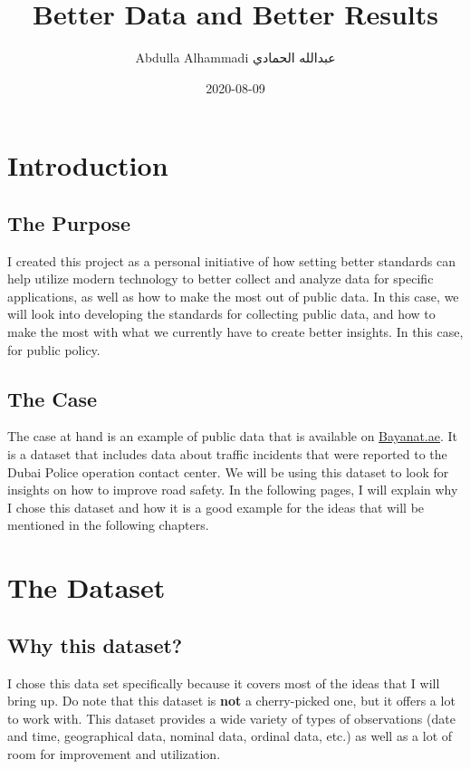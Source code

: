 \documentclass[
]{book}
\title{Better Data and Better Results}
\author{Abdulla Alhammadi \textbar{} عبدالله الحمادي}
\date{2020-08-09}
\begin{document}
\maketitle

{
\setcounter{tocdepth}{1}
\tableofcontents
}
\hypertarget{intro}{%
\chapter{Introduction}\label{intro}}

\hypertarget{the-purpose}{%
\section{The Purpose}\label{the-purpose}}

I created this project as a personal initiative of how setting better standards can help utilize modern technology to better collect and analyze data for specific applications, as well as how to make the most out of public data. In this case, we will look into developing the standards for collecting public data, and how to make the most with what we currently have to create better insights. In this case, for public policy.

\hypertarget{the-case}{%
\section{The Case}\label{the-case}}

The case at hand is an example of public data that is available on \href{https://bayanat.ae}{Bayanat.ae}. It is a dataset that includes data about traffic incidents that were reported to the Dubai Police operation contact center. We will be using this dataset to look for insights on how to improve road safety. In the following pages, I will explain why I chose this dataset and how it is a good example for the ideas that will be mentioned in the following chapters.

\hypertarget{the-dataset}{%
\chapter{The Dataset}\label{the-dataset}}

\hypertarget{why-this-dataset}{%
\section{Why this dataset?}\label{why-this-dataset}}

I chose this data set specifically because it covers most of the ideas that I will bring up. Do note that this dataset is \textbf{not} a cherry-picked one, but it offers a lot to work with. This dataset provides a wide variety of types of observations (date and time, geographical data, nominal data, ordinal data, etc.) as well as a lot of room for improvement and utilization.
\end{document}
